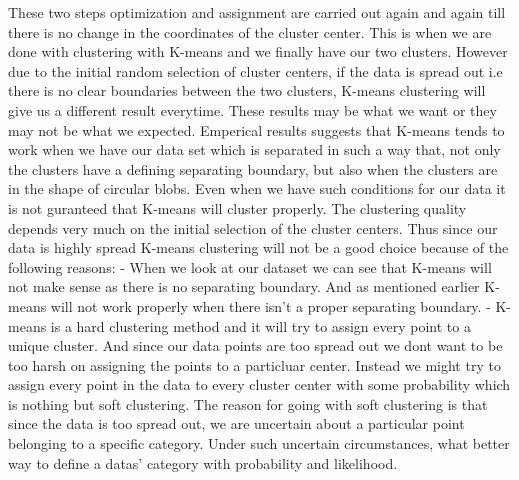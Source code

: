 \documentclass[11pt]{article}
\begin{document}
These two steps optimization and assignment are carried out again and
again till there is no change in the coordinates of the cluster center.
This is when we are done with clustering with K-means and we finally
have our two clusters. However due to the initial random selection of
cluster centers, if the data is spread out i.e there is no clear
boundaries between the two clusters, K-means clustering will give us a
different result everytime. These results may be what we want or they
may not be what we expected. Emperical results suggests that K-means
tends to work when we have our data set which is separated in such a way
that, not only the clusters have a defining separating boundary, but
also when the clusters are in the shape of circular blobs. Even when we
have such conditions for our data it is not guranteed that K-means will
cluster properly. The clustering quality depends very much on the
initial selection of the cluster centers. Thus since our data is highly
spread K-means clustering will not be a good choice because of the
following reasons: - When we look at our dataset we can see that K-means
will not make sense as there is no separating boundary. And as mentioned
earlier K-means will not work properly when there isn't a proper
separating boundary. - K-means is a hard clustering method and it will
try to assign every point to a unique cluster. And since our data points
are too spread out we dont want to be too harsh on assigning the points
to a particluar center. Instead we might try to assign every point in
the data to every cluster center with some probability which is nothing
but soft clustering. The reason for going with soft clustering is that
since the data is too spread out, we are uncertain about a particular
point belonging to a specific category. Under such uncertain
circumstances, what better way to define a datas' category with
probability and likelihood.
\end{document}
